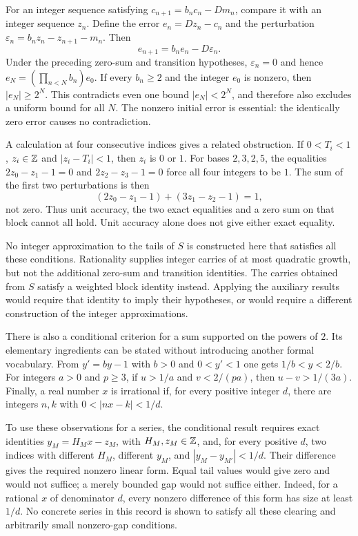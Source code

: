 \documentclass[11pt]{article}
\theoremstyle{remark}
\theoremstyle{plain}
\begin{document}
For an integer sequence satisfying $c_{n+1}=b_nc_n-Dm_n$, compare it with
an integer sequence $z_n$.  Define the error $e_n=Dz_n-c_n$ and the
perturbation $\varepsilon_n=b_nz_n-z_{n+1}-m_n$.  Then
\[
 e_{n+1}=b_ne_n-D\varepsilon_n.
\]
Under the preceding zero-sum and transition hypotheses,
$\varepsilon_n=0$ and hence
$e_N=(\prod_{n<N}b_n)e_0$.  If every $b_n\ge2$ and the integer $e_0$ is
nonzero, then $|e_N|\ge2^N$.  This contradicts even one bound
$|e_N|<2^N$, and therefore also excludes a uniform bound for all $N$.
The nonzero initial error is essential: the identically zero error causes
no contradiction.

A calculation at four consecutive indices gives a related obstruction.  If
$0<T_i<1$, $z_i\in\mathbb{Z}$ and $|z_i-T_i|<1$, then $z_i$ is $0$ or $1$.
For bases $2,3,2,5$, the equalities
$2z_0-z_1-1=0$ and $2z_2-z_3-1=0$ force all four integers to be $1$.
The sum of the first two perturbations is then
\[
 (2z_0-z_1-1)+(3z_1-z_2-1)=1,
\]
not zero.  Thus unit accuracy, the two exact equalities and a zero sum on
that block cannot all hold.  Unit accuracy alone does not give either
exact equality.

No integer approximation to the tails of $S$ is constructed here that
satisfies all these conditions.
Rationality supplies integer carries of at most quadratic growth, but
not the additional zero-sum and transition identities.  The carries obtained from $S$ satisfy a weighted block identity
instead.  Applying the auxiliary results
would require that identity to imply their hypotheses, or would require
a different construction of the integer approximations.

There is also a conditional criterion for a sum supported on the powers
of $2$.  Its elementary ingredients can be stated without introducing
another formal vocabulary.  From $y'=by-1$ with $b>0$ and $0<y'<1$ one
gets $1/b<y<2/b$.  For integers $a>0$ and $p\ge3$, if $u>1/a$ and
$v<2/(pa)$, then
$u-v>1/(3a)$.  Finally, a real number $x$ is irrational if, for every
positive integer $d$, there are integers $n,k$ with
$0<|nx-k|<1/d$.

To use these observations for a series, the conditional result
requires exact identities $y_M=H_Mx-z_M$, with $H_M,z_M\in\mathbb{Z}$, and,
for every positive $d$, two indices with different $H_M$, different
$y_M$, and $|y_M-y_{M'}|<1/d$.  Their difference gives the required
nonzero linear form.  Equal tail values would give zero and would not suffice;
a merely bounded gap would not suffice either.  Indeed, for a rational
$x$ of denominator $d$, every nonzero difference of this form has size at
least $1/d$.  No concrete series in this record is shown to satisfy all
these clearing and arbitrarily small nonzero-gap conditions.
\end{document}
